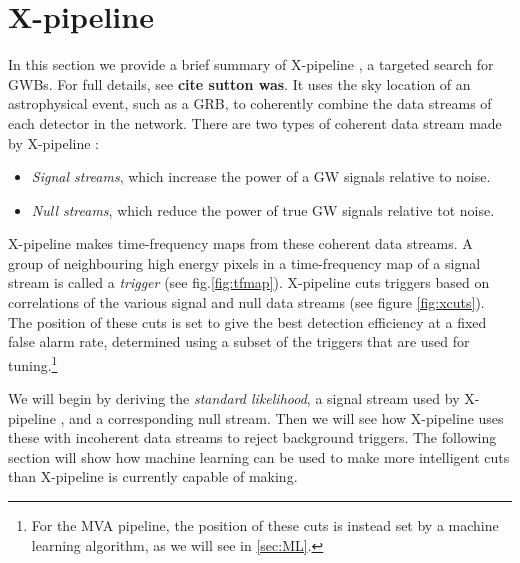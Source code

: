 \documentclass[11pt]{cuthesis}
\newcommand{\xp}{X-pipeline }
\begin{document}
\section{X-pipeline} \label{xtriggers}
In this section we provide a brief summary of {\xp}, a targeted search for GWBs. For full details, see \textbf{cite sutton was}. It uses the sky location of an astrophysical event, such as a GRB, to coherently combine the data streams of each detector in the network. There are two types of coherent data stream made by \xp:
\begin{itemize}
\item \textit{Signal streams}, which increase the power of a GW signals relative to noise.
\item \textit{Null streams}, which reduce the power of true GW signals relative tot noise.
\end{itemize}
\xp makes time-frequency maps from these coherent data streams. A group of neighbouring high energy pixels in a time-frequency map of a signal stream is called a  \textit{trigger} (see fig.\ref{fig:tfmap}). \xp cuts triggers based on correlations of the various signal and null data streams (see figure \ref{fig:xcuts}). The position of these cuts is set to give the best detection efficiency at a fixed false alarm rate, determined using a subset of the triggers that are used for tuning.\footnote{For the MVA pipeline, the position of these cuts is instead set by a machine learning algorithm, as we will see in \ref{sec:ML}.}

We will begin by deriving the \textit{standard likelihood}, a signal stream used by \xp, and a corresponding null stream. Then we will see how \xp uses these with incoherent data streams to reject background triggers. The following section will show how machine learning can be used to make more intelligent cuts than \xp is currently capable of making.
\end{document}
